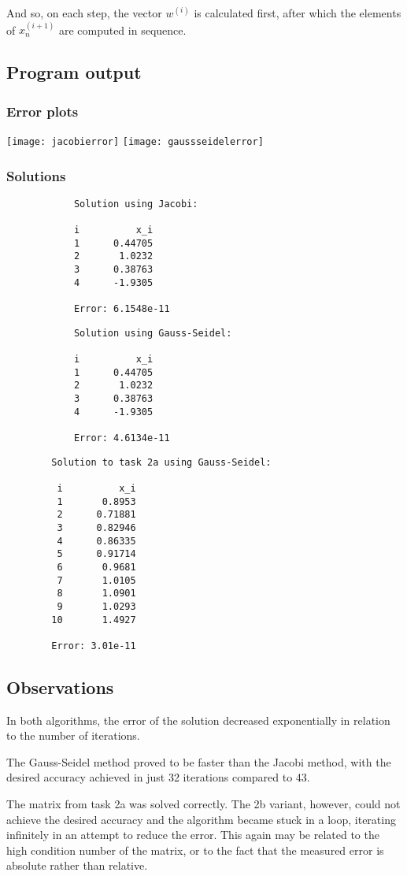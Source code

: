 \documentclass{article}
\begin{document}
	And so, on each step, the vector $w^{(i)}$ is calculated first, after which
	the elements of $x_n^{(i + 1)}$ are computed in sequence.
	
	\subsection{Program output}
	
	\subsubsection{Error plots}
	
	\texttt{[image: jacobierror]}
	\texttt{[image: gaussseidelerror]}
	
	\subsubsection{Solutions}
	
	\begin{multicols}{2}
		\begin{verbatim}
			Solution using Jacobi:

			i          x_i
			1      0.44705
			2       1.0232
			3      0.38763
			4      -1.9305

			Error: 6.1548e-11
		\end{verbatim}
		\begin{verbatim}
			Solution using Gauss-Seidel:

			i          x_i
			1      0.44705
			2       1.0232
			3      0.38763
			4      -1.9305

			Error: 4.6134e-11
		\end{verbatim}
	\end{multicols}
	
	\begin{verbatim}
		Solution to task 2a using Gauss-Seidel:
		
		 i          x_i
		 1       0.8953
		 2      0.71881
		 3      0.82946
		 4      0.86335
		 5      0.91714
		 6       0.9681
		 7       1.0105
		 8       1.0901
		 9       1.0293
		10       1.4927

		Error: 3.01e-11
	\end{verbatim}
	
	\subsection{Observations}
	
	In both algorithms, the error of the solution decreased exponentially in
	relation to the number of iterations.
	
	The Gauss-Seidel method proved to be faster than the Jacobi method, with the
	desired accuracy achieved in just 32 iterations compared to 43.
	
	The matrix from task 2a was solved correctly. The 2b variant, however, could
	not achieve the desired accuracy and the algorithm became stuck in a
	loop, iterating infinitely in an attempt to reduce the error. This again
	may be related to the high condition number of the matrix, or to the fact
	that the measured error is absolute rather than relative.
	
\end{document}
